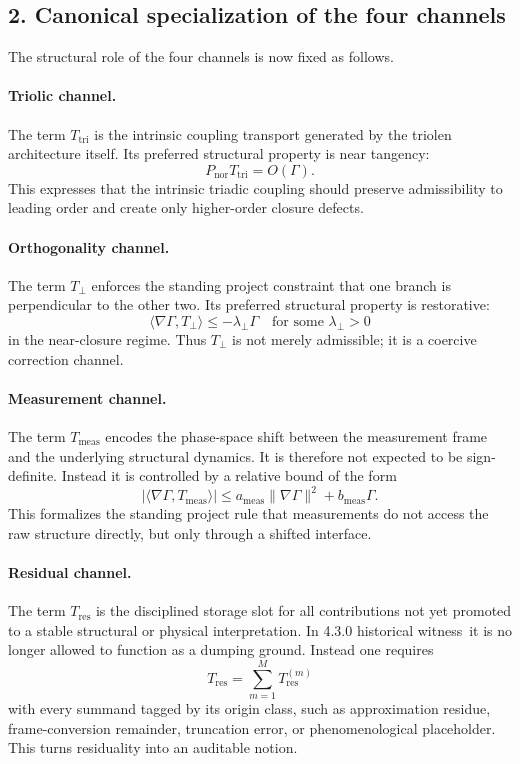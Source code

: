 \documentclass[12pt,a4paper]{article}
\newcommand{\docversion}{4.3.0 historical witness}
\begin{document}
\subsection*{2. Canonical specialization of the four channels}
The structural role of the four channels is now fixed as follows.

\paragraph{Triolic channel.}
The term $T_{\mathrm{tri}}$ is the intrinsic coupling transport generated by the
triolen architecture itself. Its preferred structural property is near tangency:
\[
P_{\mathrm{nor}}T_{\mathrm{tri}} = O(\Gamma).
\]
This expresses that the intrinsic triadic coupling should preserve admissibility to
leading order and create only higher-order closure defects.

\paragraph{Orthogonality channel.}
The term $T_{\perp}$ enforces the standing project constraint that one branch is
perpendicular to the other two. Its preferred structural property is restorative:
\[
\langle \nabla\Gamma, T_{\perp}\rangle \le -\lambda_{\perp}\Gamma
\quad\text{for some }\lambda_{\perp}>0
\]
in the near-closure regime. Thus $T_{\perp}$ is not merely admissible; it is a
coercive correction channel.

\paragraph{Measurement channel.}
The term $T_{\mathrm{meas}}$ encodes the phase-space shift between the measurement
frame and the underlying structural dynamics. It is therefore not expected to be
sign-definite. Instead it is controlled by a relative bound of the form
\[
|\langle \nabla\Gamma, T_{\mathrm{meas}}\rangle|
\le a_{\mathrm{meas}}\|\nabla\Gamma\|^2 + b_{\mathrm{meas}}\Gamma.
\]
This formalizes the standing project rule that measurements do not access the raw
structure directly, but only through a shifted interface.

\paragraph{Residual channel.}
The term $T_{\mathrm{res}}$ is the disciplined storage slot for all contributions not
yet promoted to a stable structural or physical interpretation. In \docversion\ it is no longer allowed to function as a dumping ground. Instead one requires
\[
T_{\mathrm{res}} = \sum_{m=1}^M T_{\mathrm{res}}^{(m)}
\]
with every summand tagged by its origin class, such as approximation residue,
frame-conversion remainder, truncation error, or phenomenological placeholder.
This turns residuality into an auditable notion.
\end{document}
